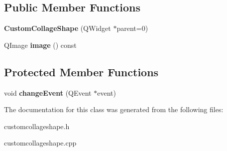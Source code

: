 \subsection*{Public Member Functions}
\begin{DoxyCompactItemize}
\item 
\hypertarget{class_custom_collage_shape_ad2746c907d1d327868094dc4c55ce4e9}{
{\bfseries CustomCollageShape} (QWidget $\ast$parent=0)}
\label{class_custom_collage_shape_ad2746c907d1d327868094dc4c55ce4e9}

\item 
\hypertarget{class_custom_collage_shape_ac0e884b0afe485a43e9d8ae4444ac8a3}{
QImage {\bfseries image} () const }
\label{class_custom_collage_shape_ac0e884b0afe485a43e9d8ae4444ac8a3}

\end{DoxyCompactItemize}
\subsection*{Protected Member Functions}
\begin{DoxyCompactItemize}
\item 
\hypertarget{class_custom_collage_shape_a2fc765698dcd67780e79996d8e25c164}{
void {\bfseries changeEvent} (QEvent $\ast$event)}
\label{class_custom_collage_shape_a2fc765698dcd67780e79996d8e25c164}

\end{DoxyCompactItemize}


The documentation for this class was generated from the following files:\begin{DoxyCompactItemize}
\item 
customcollageshape.h\item 
customcollageshape.cpp\end{DoxyCompactItemize}
